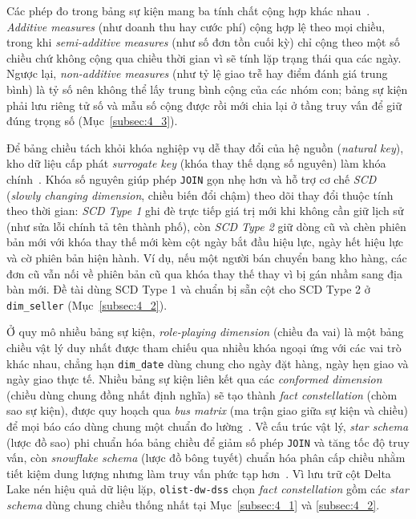 \documentclass[a4paper]{article}
\begin{document}
Các phép đo trong bảng sự kiện mang ba tính chất cộng hợp khác nhau~\cite{bib:kimball2013}. \textit{Additive measures} (như doanh thu hay cước phí) cộng hợp lệ theo mọi chiều, trong khi \textit{semi-additive measures} (như số đơn tồn cuối kỳ) chỉ cộng theo một số chiều chứ không cộng qua chiều thời gian vì sẽ tính lặp trạng thái qua các ngày. Ngược lại, \textit{non-additive measures} (như tỷ lệ giao trễ hay điểm đánh giá trung bình) là tỷ số nên không thể lấy trung bình cộng của các nhóm con; bảng sự kiện phải lưu riêng tử số và mẫu số cộng được rồi mới chia lại ở tầng truy vấn để giữ đúng trọng số (Mục~\ref{subsec:4_3}).

Để bảng chiều tách khỏi khóa nghiệp vụ dễ thay đổi của hệ nguồn (\textit{natural key}), kho dữ liệu cấp phát \textit{surrogate key} (khóa thay thế dạng số nguyên) làm khóa chính~\cite{bib:kimball2013}. Khóa số nguyên giúp phép \texttt{JOIN} gọn nhẹ hơn và hỗ trợ cơ chế \textit{SCD} (\textit{slowly changing dimension}, chiều biến đổi chậm) theo dõi thay đổi thuộc tính theo thời gian: \textit{SCD Type 1} ghi đè trực tiếp giá trị mới khi không cần giữ lịch sử (như sửa lỗi chính tả tên thành phố), còn \textit{SCD Type 2} giữ dòng cũ và chèn phiên bản mới với khóa thay thế mới kèm cột ngày bắt đầu hiệu lực, ngày hết hiệu lực và cờ phiên bản hiện hành. Ví dụ, nếu một người bán chuyển bang kho hàng, các đơn cũ vẫn nối về phiên bản cũ qua khóa thay thế thay vì bị gán nhầm sang địa bàn mới. Đề tài dùng SCD Type 1 và chuẩn bị sẵn cột cho SCD Type 2 ở \texttt{dim\_seller} (Mục~\ref{subsec:4_2}).

Ở quy mô nhiều bảng sự kiện, \textit{role-playing dimension} (chiều đa vai) là một bảng chiều vật lý duy nhất được tham chiếu qua nhiều khóa ngoại ứng với các vai trò khác nhau, chẳng hạn \texttt{dim\_date} dùng chung cho ngày đặt hàng, ngày hẹn giao và ngày giao thực tế. Nhiều bảng sự kiện liên kết qua các \textit{conformed dimension} (chiều dùng chung đồng nhất định nghĩa) sẽ tạo thành \textit{fact constellation} (chòm sao sự kiện), được quy hoạch qua \textit{bus matrix} (ma trận giao giữa sự kiện và chiều) để mọi báo cáo dùng chung một chuẩn đo lường~\cite{bib:kimball2013}. Về cấu trúc vật lý, \textit{star schema} (lược đồ sao) phi chuẩn hóa bảng chiều để giảm số phép \texttt{JOIN} và tăng tốc độ truy vấn, còn \textit{snowflake schema} (lược đồ bông tuyết) chuẩn hóa phân cấp chiều nhằm tiết kiệm dung lượng nhưng làm truy vấn phức tạp hơn~\cite{bib:kimball2013,bib:golfarelli1998}. Vì lưu trữ cột Delta Lake nén hiệu quả dữ liệu lặp, \texttt{olist-dw-dss} chọn \textit{fact constellation} gồm các \textit{star schema} dùng chung chiều thống nhất tại Mục~\ref{subsec:4_1} và \ref{subsec:4_2}.
\end{document}
